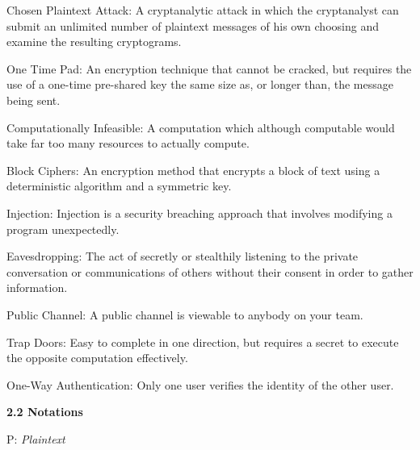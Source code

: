 \documentclass{article}
\begin{document}
\begin{flushleft}
\hspace{0.5cm} Chosen Plaintext Attack: A cryptanalytic attack in
which the cryptanalyst can submit an unlimited number
of plaintext messages of his own choosing and examine the
resulting cryptograms. \newline

\hspace{0.5cm} One Time Pad: An encryption technique that cannot be cracked, but requires the use of a one-time pre-shared key the same size as, or longer than, the message being sent.\newline

\hspace{0.5cm} Computationally Infeasible: A computation which although computable would take far too many resources to actually compute. \newline

\hspace{0.5cm} Block Ciphers: An encryption method that encrypts a block of text using a deterministic algorithm and a symmetric key. \newline

\hspace{0.5cm} Injection: Injection is a security breaching approach that involves modifying a program unexpectedly. \newline

\hspace{0.5cm} Eavesdropping: The act of secretly or stealthily listening to the private conversation or communications of others without their consent in order to gather information. \newline

\hspace{0.5cm} Public Channel: A public channel is viewable to anybody on your team. \newline

\hspace{0.5cm} Trap Doors: Easy to complete in one direction, but requires a secret to execute the opposite computation effectively. \newline

\hspace{0.5cm} One-Way Authentication: Only one user verifies the identity of the other user.\newline

\textbf{2.2 Notations} \newline

\hspace{0.5cm} P: \textit{Plaintext}


\end{flushleft}
\end{document}
